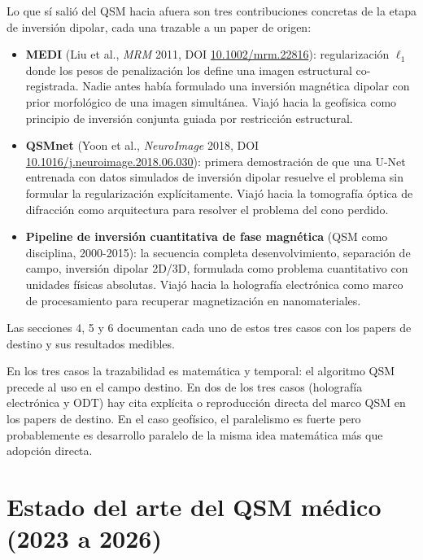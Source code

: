 \documentclass[12pt, a4paper]{article}
\begin{document}
Lo que sí salió del QSM hacia afuera son tres contribuciones concretas de la etapa de inversión dipolar, cada una trazable a un paper de origen:

\begin{itemize}[leftmargin=2em, itemsep=4pt]
  \item \textbf{MEDI} (Liu et al., \emph{MRM} 2011, DOI \href{https://doi.org/10.1002/mrm.22816}{10.1002/mrm.22816}): regularización $\ell_1$ donde los pesos de penalización los define una imagen estructural co-registrada. Nadie antes había formulado una inversión magnética dipolar con prior morfológico de una imagen simultánea. Viajó hacia la geofísica como principio de inversión conjunta guiada por restricción estructural.
  \item \textbf{QSMnet} (Yoon et al., \emph{NeuroImage} 2018, DOI \href{https://doi.org/10.1016/j.neuroimage.2018.06.030}{10.1016/j.neuroimage.2018.06.030}): primera demostración de que una U-Net entrenada con datos simulados de inversión dipolar resuelve el problema sin formular la regularización explícitamente. Viajó hacia la tomografía óptica de difracción como arquitectura para resolver el problema del cono perdido.
  \item \textbf{Pipeline de inversión cuantitativa de fase magnética} (QSM como disciplina, 2000-2015): la secuencia completa desenvolvimiento, separación de campo, inversión dipolar 2D/3D, formulada como problema cuantitativo con unidades físicas absolutas. Viajó hacia la holografía electrónica como marco de procesamiento para recuperar magnetización en nanomateriales.
\end{itemize}

Las secciones 4, 5 y 6 documentan cada uno de estos tres casos con los papers de destino y sus resultados medibles.

\begin{destacado}
  En los tres casos la trazabilidad es matemática y temporal: el algoritmo QSM precede al uso en el campo destino. En dos de los tres casos (holografía electrónica y ODT) hay cita explícita o reproducción directa del marco QSM en los papers de destino. En el caso geofísico, el paralelismo es fuerte pero probablemente es desarrollo paralelo de la misma idea matemática más que adopción directa.
\end{destacado}

\section{Estado del arte del QSM médico (2023 a 2026)}
\end{document}
